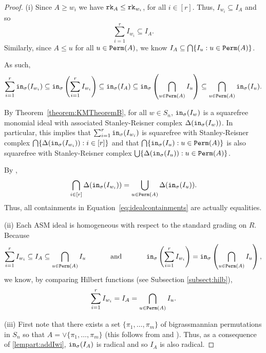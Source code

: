 \documentclass[12pt,reqno]{amsart}
\newtheorem{Main Conjecture}[theorem]{Main Conjecture}
\theoremstyle{remark}
\theoremstyle{plain}
\newcommand{\init}{{\tt in}}
\newcommand{\perm}{{\tt Perm}}
\newcommand{\rk}{{\tt rk}}
\begin{document}
\begin{proof}

\noindent (i) Since $A\geq w_{i}$  we have $\rk_A\leq \rk_{w_i}$, for all $i\in [r]$.  Thus, $I_{w_i}\subseteq I_{A}$ and so \[\sum_{i=1}^r I_{w_i}\subseteq I_A.\]
Similarly, since $A\leq u$ for all $u\in \perm(A)$, we know 
$ I_A\subseteq \bigcap\{ I_u:u\in \perm(A)\}$.

As such,
\begin{equation}
\label{eq:idealcontainments}
    \sum_{i=1}^r \init_\sigma(I_{w_i})\subseteq \init_\sigma\left(\sum_{i=1}^r I_{w_i}\right)\subseteq \init_\sigma(I_A)\subseteq \init_\sigma\left(\bigcap_{u\in \perm(A)}I_{u}\right)\subseteq \bigcap_{u\in \perm(A)}\init_\sigma(I_u).
\end{equation}

By Theorem~\ref{theorem:KMTheoremB}, for all $w\in S_n$, $\init_\sigma(I_w)$ is a squarefree monomial ideal with associated Stanley-Reisner complex $\Delta(\init_\sigma(I_w))$.  In particular, this implies that 
$ \sum_{i=1}^r\init_\sigma(I_{w_i})$ is squarefree with Stanley-Reisner complex 
$ \bigcap\{ \Delta(\init_\sigma(I_{w_i})):i \in [r]\}$
and that 
$\bigcap\{\init_\sigma(I_u):u\in \perm(A)\}$
is also squarefree with Stanley-Reisner complex 
$ \bigcup\{\Delta(\init_\sigma(I_u)):u\in \perm(A)\}$. 

By \cite[Proposition~4.8]{Wei}, \[\bigcap_{i \in [r]} \Delta(\init_\sigma(I_{w_i}))=\bigcup_{u\in \perm(A)}\Delta(\init_\sigma(I_u)).\]  Thus, all containments in Equation~\ref{eq:idealcontainments} are actually equalities.



\noindent (ii) Each ASM ideal is homogeneous with respect to the standard grading on $R$.
Because
\[\sum_{i=1}^r I_{w_i}\subseteq I_A\subseteq \bigcap_{u\in \perm(A)} I_u \mbox{ \hspace{1cm} and \hspace{1cm} } \displaystyle \init_\sigma\left(\sum_{i=1}^r I_{w_i}\right)=\init_\sigma\left (\bigcap_{u\in \perm(A)} I_u\right),
\]we know, by comparing Hilbert functions (see Subsection \ref{subsect:hilb}),
\[\sum_{i=1}^r I_{w_i}= I_A= \bigcap_{u\in \perm(A)} I_u.\]

\noindent (iii) First note that there exists a set $\{\pi_1,\ldots,\pi_m\}$ of bigrassmannian permutations in $S_n$ so that $A=\vee \{\pi_1,\ldots,\pi_m\}$ (this follows from \cite{LS96} and \cite[Proposition~9]{Rea02}). Thus, as a consequence of \ref{lempart:addIwi}, $\init_\sigma(I_A)$ is radical and so $I_A$ is also radical.


\end{proof}
\end{document}
